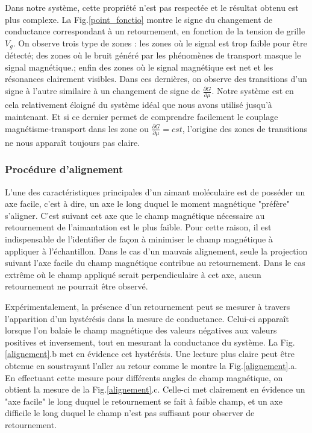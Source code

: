 Dans notre système, cette propriété n'est pas respectée et le résultat obtenu est plus complexe. La Fig.\ref{point_fonctio} montre le signe du changement de conductance correspondant à un retournement, en fonction de la tension de grille $V_g$. On observe trois type de zones : les zones où le signal est trop faible pour être détecté; des zones où le bruit généré par les phénomènes de transport masque le signal magnétique.; enfin des zones où le signal magnétique est net et les résonances clairement visibles. Dans ces dernières, on observe des transitions d'un signe à l'autre similaire à un changement de signe de $\frac{\partial G}{\partial \mu}$. Notre système est en cela relativement éloigné du système idéal que nous avons utilisé jusqu'à maintenant. Et si ce dernier permet de comprendre facilement le couplage magnétisme-transport dans les zone ou $\frac{\partial G}{\partial \mu} = cst$, l'origine des zones de transitions ne nous apparaît toujours pas claire.


\subsubsection{Procédure d'alignement}

L'une des caractéristiques principales d'un aimant moléculaire est de posséder un axe facile, c'est à dire, un axe le long duquel le moment magnétique "préfère" s'aligner. C'est suivant cet axe que le champ magnétique nécessaire au retournement de l'aimantation est le plus faible. Pour cette raison, il est indispensable de l'identifier de façon à minimiser le champ magnétique à appliquer à l'échantillon. Dans le cas d'un mauvais alignement, seule la projection suivant l'axe facile du champ magnétique contribue au retournement. Dans le cas extrême où le champ appliqué serait perpendiculaire à cet axe, aucun retournement ne pourrait être observé.

Expérimentalement, la présence d'un retournement peut se mesurer à travers l'apparition d'un hystérésis dans la mesure de conductance. Celui-ci apparaît lorsque l'on balaie le champ magnétique des valeurs négatives aux valeurs positives et inversement, tout en mesurant la conductance du système. La Fig.\ref{alignement}.b met en évidence cet hystérésis. Une lecture plus claire peut être obtenue en soustrayant l'aller au retour comme le montre la Fig.\ref{alignement}.a. En effectuant cette mesure pour différents angles de champ magnétique, on obtient la mesure de la Fig.\ref{alignement}.c. Celle-ci met clairement en évidence un "axe facile" le long duquel le retournement se fait à faible champ, et un axe difficile le long duquel le champ n'est pas suffisant pour observer de retournement.

